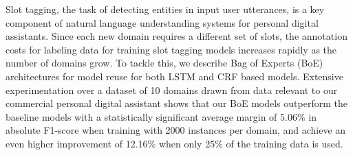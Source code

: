 Slot tagging, the task of detecting entities in input user utterances, is a key component of natural language understanding systems for personal digital assistants. Since each new domain requires a different set of slots, the annotation costs for labeling data for training slot tagging models increases rapidly as the number of domains grow. To tackle this, we describe Bag of Experts (BoE) architectures for model reuse for both LSTM and CRF based models. Extensive experimentation over a dataset of 10 domains drawn from data relevant to our commercial personal digital assistant shows that our BoE models outperform the baseline models with a statistically significant average margin of 5.06\% in absolute F1-score when training with 2000 instances per domain, and achieve an even higher improvement of 12.16\% when only 25\% of the training data is used.
